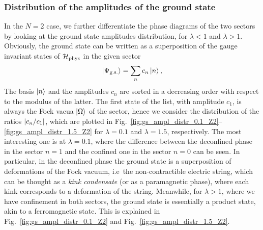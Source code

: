 \subsubsection{Distribution of the amplitudes of the ground state}
\label{ssub:amplitudes_distribution}

In the $N=2$ case, we further differentiate the phase diagrams of the two sectors by looking at the ground state amplitudes distribution, for $\lambda<1$ and $\lambda>1$.
Obviously, the ground state can be written as a superposition of the gauge invariant states of $\mathcal{H}_{\text{phys}}$ in the given sector
\begin{equation}
    \ket{\Psi_{\text{g.s.} }}= \sum_n c_n \ket{n},
    \label{eq:gs_amplitudes}
\end{equation}
The basis $\ket{n}$ and the amplitudes $c_n$ are sorted in a decreasing order with respect to the modulus of the latter.
The first state of the list, with amplitude $c_1$, is always the Fock vacua $\ket{\Omega}$ of the sector, hence we consider the distribution of the ratios $\abs{c_n / c_1}$, which are plotted in Fig.~\ref{fig:gs_ampl_distr_0.1_Z2}--\ref{fig:gs_ampl_distr_1.5_Z2} for $\lambda=0.1$ and $\lambda=1.5$, respectively.
The most interesting one is at $\lambda = 0.1$, where the difference between the deconfined phase in the sector $n=1$ and the confined one in the sector $n=0$ can be seen.
In particular, in the deconfined phase the ground state is a superposition of deformations of the Fock vacuum, i.e~the non-contractible electric string, which can be thought as a \emph{kink condensate} \cite{fradkin1978order} (or as a paramagnetic phase), where each kink corresponds to a deformation of the string.
Meanwhile, for $\lambda > 1$, where we have confinement in both sectors, the ground state is essentially a product state, akin to a ferromagnetic state.
This is explained in Fig.~\ref{fig:gs_ampl_distr_0.1_Z2} and Fig.~\ref{fig:gs_ampl_distr_1.5_Z2}.



